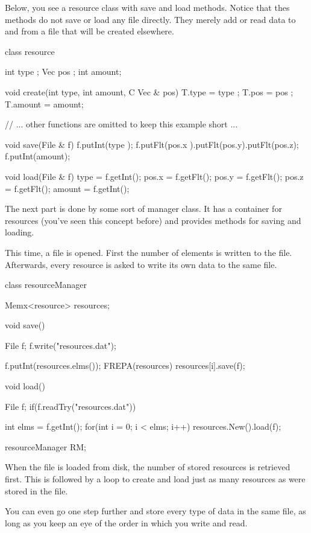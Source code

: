 Below, you see a resource class with save and load methods. Notice that thes methods do not save or load any file directly. They merely add or read data to and from a file that will be created elsewhere.

\begin{code}
class resource {
  int type  ;
	Vec pos   ;
	int amount;
	
	void create(int type, int amount, C Vec & pos) {
	  T.type   = type  ;
		T.pos    = pos   ;
		T.amount = amount;
	}
	
	// ... other functions are omitted to keep this example short ...
	
	void save(File & f) {
	  f.putInt(type  );
		f.putFlt(pos.x ).putFlt(pos.y).putFlt(pos.z);
		f.putInt(amount);
	}
	
	void load(File & f) {
	  type   = f.getInt();
		pos.x  = f.getFlt();
		pos.y  = f.getFlt();
		pos.z  = f.getFlt();
		amount = f.getInt();
	}
}	
\end{code}

The next part is done by some sort of manager class. It has a container for resources (you've seen this concept before) and provides methods for saving and loading. 

This time, a file is opened. First the number of elements is written to the file. Afterwards, every resource is asked to write its own data to the same file.

\begin{code}
class resourceManager {
  Memx<resource> resources;
	
	void save() {
		File f;
		f.write("resources.dat");
		
		f.putInt(resources.elms());
		FREPA(resources) {
			resources[i].save(f);
		}
	}
	
	void load() {
	  File f;
		if(f.readTry("resources.dat")) {
			
			int elms = f.getInt();
			for(int i = 0; i < elms; i++) {
				resources.New().load(f);
			}
		}
	}
}

resourceManager RM;
\end{code}

When the file is loaded from disk, the number of stored resources is retrieved first. This is followed by a loop to create and load just as many resources as were stored in the file.

You can even go one step further and store every type of data in the same file, as long as you keep an eye of the order in which you write and read.

